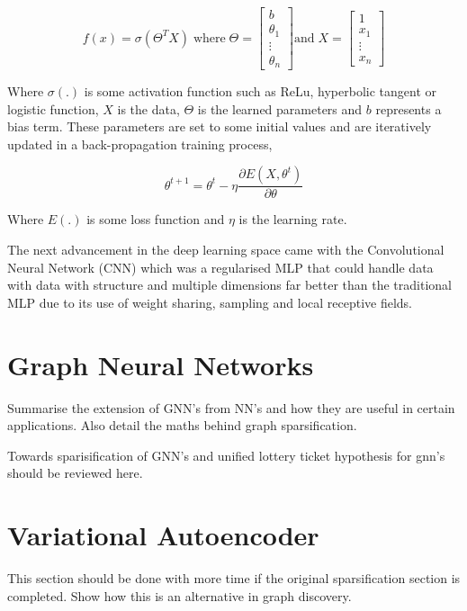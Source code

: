 \documentclass[honours,12pt]{unswthesis}
\numberwithin{equation}{section}
\begin{document}
\begin{equation}
    f(x) = \sigma(\Theta^T X)  \; \text{where}  \; \Theta= \begin{bmatrix} b \\ \theta_1 \\ \vdots \\ \theta_n \end{bmatrix} \text{and} \; X = \begin{bmatrix} 1 \\ x_1 \\ \vdots \\ x_n \end{bmatrix}
\end{equation}

\noindent Where $\sigma(.)$ is some activation function such as ReLu, hyperbolic tangent or logistic function, $X$ is the data, $\Theta$ is the learned parameters and $b$ represents a bias term.
These parameters are set to some initial values and are iteratively updated in a back-propagation training process,

\begin{equation}
    \theta^{t+1} = \theta^{t} - \eta\frac{\partial E(X, \theta^t)}{\partial\theta}
\end{equation}

\noindent Where $E(.)$ is some loss function and $\eta$ is the learning rate.

The next advancement in the deep learning space came with the Convolutional Neural Network (CNN) which was a regularised MLP that could
handle data with data with structure and multiple dimensions far better than the traditional MLP due to its use of weight sharing, sampling
and local receptive fields.
\section{Graph Neural Networks}\label{gnn}
Summarise the extension of GNN's from NN's and how they are useful in certain applications.
Also detail the maths behind graph sparsification.

Towards sparisification of GNN's \cite{peng2023sparsification}
and unified lottery ticket hypothesis \cite{chen2021unified} for gnn's should be reviewed here.




\section{Variational Autoencoder}\label{vae}
This section should be done with more time if the original sparsification section is completed.
Show how this is an alternative in graph discovery.
\end{document}
